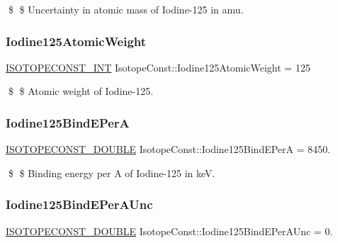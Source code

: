 \$ \$ Uncertainty in atomic mass of Iodine-\/125 in amu. \mbox{\label{group___isotope_const-_iodine-_i125_ga4a523cbe67af7104be57edfcb398c267}} 
\subsubsection{\texorpdfstring{Iodine125\+Atomic\+Weight}{Iodine125AtomicWeight}}
{\footnotesize\ttfamily \mbox{\hyperlink{group___isotope_const-_macros_ga5f18360b3e99483a35c32d789e62621c}{I\+S\+O\+T\+O\+P\+E\+C\+O\+N\+S\+T\+\_\+\+I\+NT}} Isotope\+Const\+::\+Iodine125\+Atomic\+Weight = 125}

\$ \$ Atomic weight of Iodine-\/125. \mbox{\label{group___isotope_const-_iodine-_i125_ga9e6cf6f1f09edd843df0bb3efd68a599}} 
\subsubsection{\texorpdfstring{Iodine125\+Bind\+E\+PerA}{Iodine125BindEPerA}}
{\footnotesize\ttfamily \mbox{\hyperlink{group___isotope_const-_macros_ga8f45a7272ce02c0b4c65c44636ed719a}{I\+S\+O\+T\+O\+P\+E\+C\+O\+N\+S\+T\+\_\+\+D\+O\+U\+B\+LE}} Isotope\+Const\+::\+Iodine125\+Bind\+E\+PerA = 8450.}

\$ \$ Binding energy per A of Iodine-\/125 in keV. \mbox{\label{group___isotope_const-_iodine-_i125_ga335b1224cc0bcce390d2c82f1d8d2ebe}} 
\subsubsection{\texorpdfstring{Iodine125\+Bind\+E\+Per\+A\+Unc}{Iodine125BindEPerAUnc}}
{\footnotesize\ttfamily \mbox{\hyperlink{group___isotope_const-_macros_ga8f45a7272ce02c0b4c65c44636ed719a}{I\+S\+O\+T\+O\+P\+E\+C\+O\+N\+S\+T\+\_\+\+D\+O\+U\+B\+LE}} Isotope\+Const\+::\+Iodine125\+Bind\+E\+Per\+A\+Unc = 0.}

